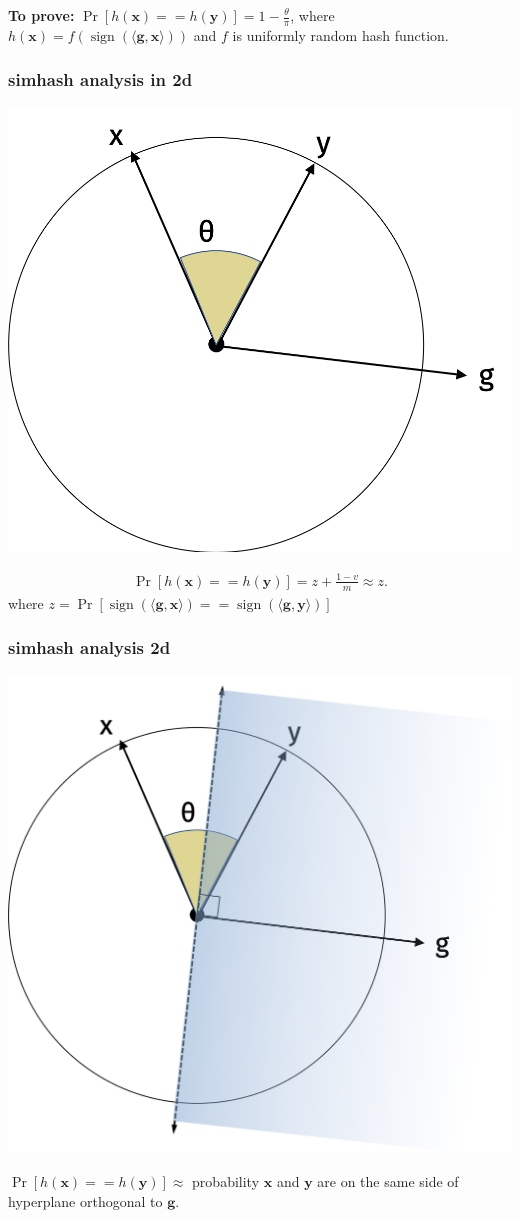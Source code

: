 \documentclass[compress]{beamer}
\newcommand{\bv}[1]{\mathbf{#1}}
\DeclareMathOperator{\sign}{sign}
\begin{document}
\begin{frame}
	\textbf{To prove:}  $\Pr[h(\bv{x}) == h(\bv{y})] = 1 - \frac{\theta}{\pi}$,  where $h(\bv{x}) = f\left(\sign(\langle \bv{g}, \bv{x} \rangle)\right)$ and $f$ is uniformly random hash function.
	\frametitle{simhash analysis in 2d}
	\vspace{-.5em}
	\begin{center}
		\includegraphics[width=.5\textwidth]{simhash1.png}
	\end{center}
\begin{align*}
	\Pr[h(\bv{x}) == h(\bv{y})] = z + \frac{1-v}{m} \approx z.
\end{align*}
where $z = \Pr[\sign(\langle \bv{g}, \bv{x} \rangle) == \sign(\langle \bv{g}, \bv{y} \rangle)]$
\end{frame}

\begin{frame}
	\frametitle{simhash analysis 2d}
	\vspace{-.5em}
	\begin{center}
		\includegraphics[width=.55\textwidth]{simhash2.png}
	\end{center}
\vspace{-.5em}
$\Pr[h(\bv{x}) == h(\bv{y})] \approx$ probability $\bv{x}$ and $\bv{y}$ are on the same side of hyperplane orthogonal to $\bv{g}$.
\end{frame}
\end{document}
